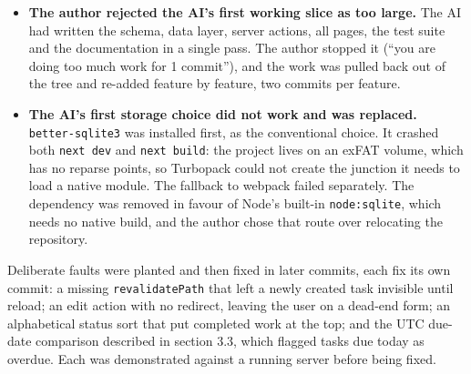\documentclass[11pt,a4paper]{article}
\begin{document}
\begin{itemize}[leftmargin=*]
  \item \textbf{The author rejected the AI's first working slice as too large.}
    The AI had written the schema, data layer, server actions, all pages, the
    test suite and the documentation in a single pass. The author stopped it
    (``you are doing too much work for 1 commit''), and the work was pulled back
    out of the tree and re-added feature by feature, two commits per feature.
  \item \textbf{The AI's first storage choice did not work and was replaced.}
    \texttt{better-sqlite3} was installed first, as the conventional choice. It
    crashed both \texttt{next dev} and \texttt{next build}: the project lives on
    an exFAT volume, which has no reparse points, so Turbopack could not create
    the junction it needs to load a native module. The fallback to webpack failed
    separately. The dependency was removed in favour of Node's built-in
    \texttt{node:sqlite}, which needs no native build, and the author chose that
    route over relocating the repository.
\end{itemize}

Deliberate faults were planted and then fixed in later commits, each fix its own
commit: a missing \texttt{revalidatePath} that left a newly created task
invisible until reload; an edit action with no redirect, leaving the user on a
dead-end form; an alphabetical status sort that put completed work at the top;
and the UTC due-date comparison described in section 3.3, which flagged tasks due
today as overdue. Each was demonstrated against a running server before being
fixed.
\end{document}
